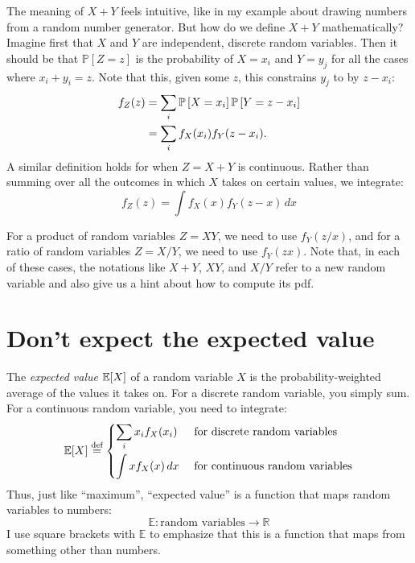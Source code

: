 The meaning of $X + Y$ feels intuitive, like in my example about drawing numbers
from a random number generator. But how do we define $X + Y$ mathematically?
Imagine first that $X$ and $Y$ are independent, discrete random variables. Then it
should be that $\mathbb{P}[Z = z]$ is the probability of $X = x_i$ and $Y = y_j$
for all the cases where $x_i + y_i = z$. Note that this, given some $z$, this
constrains $y_j$ to by $z - x_i$:
\begin{align*}
f_Z(z) &= \sum_i \mathbb{P}\left[{X=x_i}\right] \mathbb{P}\left[{Y=z-x_i}\right] \\
  &= \sum_i f_X(x_i) f_Y(z - x_i).
\end{align*}
A similar definition holds for when $Z = X + Y$ is continuous. Rather than
summing over all the outcomes in which $X$ takes on certain values, we integrate:
\begin{equation}
f_Z(z) = \int f_X(x) f_Y(z - x) \,dx
\end{equation}

For a product of random variables $Z = XY$, we need to use $f_Y(z/x)$, and for
a ratio of random variables $Z = X/Y$, we need to use $f_Y(zx)$. Note that, in
each of these cases, the notations like $X + Y$, $XY$, and $X/Y$ refer to a new
random variable and also give us a hint about how to compute its pdf.


\section{Don't expect the expected value}

The \emph{expected value} $\mathbb{E}\!\left[{X}\right]$ of a random variable $X$ is the
probability-weighted average of the values it takes on. 
For a discrete random variable, you simply sum. For a continuous random
variable, you need to integrate:
\begin{equation}
\mathbb{E}\!\left[{X}\right] \stackrel{\text{def}}{=} \begin{dcases}
  \sum_i x_i f_X(x_i) & \text{ for discrete random variables} \\
  \int x f_X(x) \,dx & \text{ for continuous random variables}
\end{dcases}
\end{equation}
Thus, just like ``maximum'', ``expected value'' is
a function that maps random variables to numbers:
\begin{equation*}
\mathbb{E} : \text{random variables} \to \mathbb{R}
\end{equation*}
I use square brackets with $\mathbb{E}$ to emphasize that this is a function
that maps from something other than numbers.

